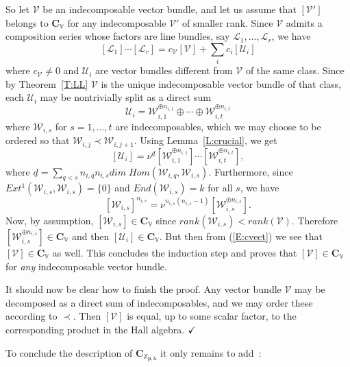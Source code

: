 \documentclass[a4paper,10pt]{amsart}
\def\qed{$\hfill \checkmark$}
\def\CC{\mathbf{C}}
\def\xpl{\mathbb{X}_{\mathbf{p},\boldsymbol{\lambda}}}
\numberwithin{equation}{section}
\begin{document}
{\vspace{.1in}
So let $\mathcal{V}$ be an indecomposable vector bundle, and let us assume that $[\mathcal{V}']$ belongs to $\CC_{\mathbb{V}}$ for any indecomposable $\mathcal{V}'$ of smaller rank. Since $\mathcal{V}$ admits a composition series whose factors are line bundles, say $\mathcal{L}_1, \ldots, \mathcal{L}_r$, we have
\begin{equation}\label{E:cvect}
[\mathcal{L}_1] \cdots [\mathcal{L}_r]=c_{\mathcal{V}}[\mathcal{V}] +\sum_i c_i [\mathcal{U}_i]
\end{equation}
where $c_{\mathcal{V}} \neq 0$ and $\mathcal{U}_i$ are vector bundles different from $\mathcal{V}$ of the same class. Since by Theorem~\ref{T:LL} $\mathcal{V}$ is the unique indecomposable vector bundle of that class, each $\mathcal{U}_i$ may be nontrivially split as a direct sum
$$\mathcal{U}_i=\mathcal{W}_{i,1}^{\oplus n_{i,1}} \oplus \cdots \oplus \mathcal{W}_{i,t}^{\oplus n_{i,t}}$$
where $\mathcal{W}_{i,s}$ for $s=1, \ldots, t$ are indecomposables, which we may choose to be ordered so that $\mathcal{W}_{i,j} \prec \mathcal{W}_{i,j+1}$. Using Lemma~\ref{L:crucial}, we get
$$[\mathcal{U}_i]=\nu^{\underline{d}} [\mathcal{W}_{i,1}^{\oplus n_{i,1}}] \cdots [\mathcal{W}_{i,t}^{\oplus n_{i,t}}],$$
where
$\underline{d}=\sum_{q<s}n_{i,q}n_{i,s}{dim\;Hom}(\mathcal{W}_{i,q},\mathcal{W}_{i,s})$. Furthermore, since $Ext^1(\mathcal{W}_{i,s},\mathcal{W}_{i,s})=\{0\}$ and $End(\mathcal{W}_{i,s})=k$ for all $s$, we have
$$[\mathcal{W}_{i,s}]^{n_{i,s}}=\nu^{n_{i,s}(n_{i,s}-1)}[\mathcal{W}_{i,s}^{\oplus n_{i,s}}].$$
Now, by assumption, $[\mathcal{W}_{i,s}] \in \CC_{\mathbb{V}}$ since $rank(\mathcal{W}_{i,s}) < rank(\mathcal{V})$. Therefore $[\mathcal{W}_{i,s}^{\oplus n_{i,s}}] \in \CC_{\mathbb{V}}$ and then
$[\mathcal{U}_i] \in \CC_{\mathbb{V}}$. But then from (\ref{E:cvect}) we see that $[\mathcal{V}] \in \CC_{\mathbb{V}}$ as well. This concludes the induction step and proves that $[\mathcal{V}] \in \CC_{\mathbb{V}}$ for \textit{any} indecomposable vector bundle.

It should now be clear how to finish the proof. Any vector bundle $\mathcal{V}$ may be decomposed as a direct sum of indecomposables, and we may order these according to $\prec$. Then $[\mathcal{V}]$ is equal, up to some scalar factor, to the corresponding product in the Hall algebra. \qed

\vspace{.15in}

To conclude the description of $\CC_{\xpl}$ it only remains to add~:

}
\end{document}
